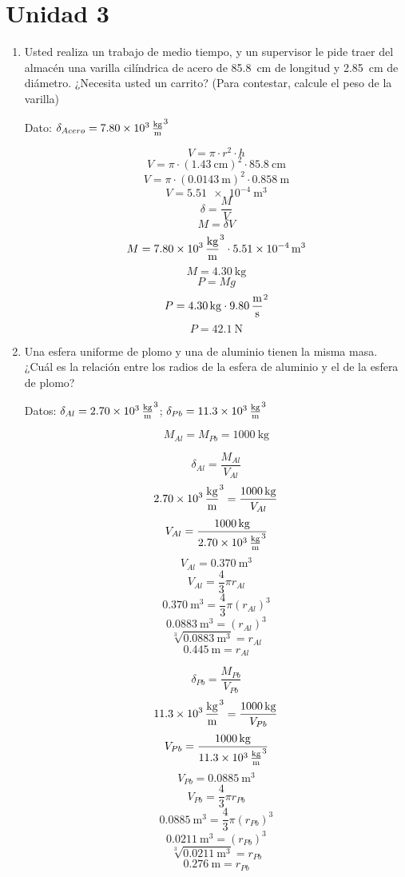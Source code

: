 \documentclass[Análisis.root.tex]{subfiles}
\begin{document}
\section{Unidad 3}

\begin{enumerate}
  \item Usted realiza un trabajo de medio tiempo, y un supervisor le pide traer del almacén una varilla cilíndrica de acero de \SI{85,8}{\cm} de longitud y \SI{2,85}{\cm} de diámetro. ¿Necesita usted un carrito? (Para contestar, calcule el peso de la varilla)

        Dato: $\delta_{Acero}= \SI{7,80e3}{\kilogram\over\meter\cubed}$

        \[V=\pi\cdot r^2\cdot h\]
        \[V=\pi\cdot(\SI{1,43}{\cm})^2\cdot\SI{85,8}{\cm}\]
        \[V=\pi\cdot(\SI{0,0143}{\meter})^2\cdot\SI{0,858}{\meter}\]
        \[V=\SI{5,51e-4}{\meter\cubed}\]
        \[\delta=\frac{M}{V}\]
        \[M=\delta V\]
        \[M=\SI{7,80e3}{\kilogram\over\meter\cubed}\cdot\SI{5,51e-4}{\meter\cubed}\]
        \[M=\SI{4,30}{\kilogram}\]
        \[P=Mg\]
        \[P=\SI{4,30}{\kilogram}\cdot\SI{9,80}{\meter\over\second\squared}\]
        \[P=\boxed{\SI{42,1}{\newton}}\]

  \item Una esfera uniforme de plomo y una de aluminio tienen la misma masa. ¿Cuál es la relación entre los radios de la esfera de aluminio y el de la esfera de plomo?

        Datos: $\delta_{Al}=\SI{2,70e3}{\kilogram\over\meter\cubed}$; $\delta_{Pb}=\SI{11,3e3}{\kilogram\over\meter\cubed}$

        \[M_{Al}=M_{Pb}=\SI{1000}{\kilogram}\]

        \begin{multicols}{2}
          \[\delta_{Al}=\frac{M_{Al}}{V_{Al}}\]
          \[\SI{2,70e3}{\kilogram\over\meter\cubed}=\frac{\SI{1000}{\kilogram}}{V_{Al}}\]
          \[V_{Al}=\frac{\SI{1000}{\kilogram}}{\SI{2,70e3}{\kilogram\over\meter\cubed}}\]
          \[V_{Al}=\SI{0,370}{\meter\cubed}\]
          \[V_{Al}=\frac{4}{3}\pi r_{Al}\]
          \[\SI{0,370}{\meter\cubed}=\frac{4}{3}\pi (r_{Al})^3\]
          \[\SI{0,0883}{\meter\cubed}=(r_{Al})^3\]
          \[\sqrt[3]{\SI{0,0883}{\meter\cubed}}=r_{Al}\]
          \[\SI{0,445}{\meter}=r_{Al}\]

          \[\delta_{Pb}=\frac{M_{Pb}}{V_{Pb}}\]
          \[\SI{11,3e3}{\kilogram\over\meter\cubed}=\frac{\SI{1000}{\kilogram}}{V_{Pb}}\]
          \[V_{Pb}=\frac{\SI{1000}{\kilogram}}{\SI{11,3e3}{\kilogram\over\meter\cubed}}\]
          \[V_{Pb}=\SI{0,0885}{\meter\cubed}\]
          \[V_{Pb}=\frac{4}{3}\pi r_{Pb}\]
          \[\SI{0,0885}{\meter\cubed}=\frac{4}{3}\pi (r_{Pb})^3\]
          \[\SI{0,0211}{\meter\cubed}=(r_{Pb})^3\]
          \[\sqrt[3]{\SI{0,0211}{\meter\cubed}}=r_{Pb}\]
          \[\SI{0,276}{\meter}=r_{Pb}\]
        \end{multicols}


\end{enumerate}
\end{document}
